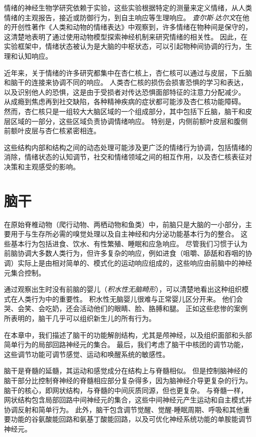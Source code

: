 情绪的神经生物学研究依赖于实验，这些实验根据特定的测量来定义情绪，从人类情绪的主观报告，接近或防御行为，到自主响应等生理响应。
\textit{查尔斯$\cdot$达尔文}在他的开创性著作《人类和动物的情绪表达》中观察到，许多情绪在物种间是保守的，这清楚地表明了通过使用动物模型探索神经机制来研究情绪的相关性。
因此，在实验框架中，情绪状态被认为是大脑的中枢状态，可以引起物种间协调的行为，生理和认知响应。


近年来，关于情绪的许多研究都集中在杏仁核上，杏仁核可以通过与皮层，下丘脑和脑干的连接来协调不同的响应。
人类杏仁核的损伤会损害恐惧的学习和表达，以及识别他人的恐惧，这是由于受损者对传达恐惧面部特征的注意力分配减少。
从成瘾到焦虑再到社交缺陷，各种精神疾病的症状都可能涉及杏仁核功能障碍。
然而，杏仁核只是一组较大大脑区域的一个组成部分，其中包括下丘脑，脑干和皮层区域的一部分，这些区域负责协调情绪响应。
特别是，内侧前额叶皮层和腹侧前额叶皮层与杏仁核紧密相连。

这些结构内部和结构之间的动态处理可能涉及更广泛的情绪行为协调，包括情绪的消除，情绪状态的认知调节，社交和情绪领域之间的相互作用，以及杏仁核表征对决策和主观感受的影响。


\chapter{脑干} \label{chap:chap40}

在原始脊椎动物（爬行动物、两栖动物和鱼类）中，前脑只是大脑的一小部分，主要用于与生存所必需的嗅觉处理以及自主神经和内分泌功能基本行为的整合。
这些基本行为包括进食、饮水、有性繁殖、睡眠和应急响应。
尽管我们习惯于认为前脑协调大多数人类行为，但许多复杂的响应，例如进食（咀嚼、舔舐和吞咽的协调）实际上是由相对简单的、模式化的运动响应组成的，这些响应由前脑中的神经元集合控制。


通过观察出生时没有前脑的婴儿（\textit{积水性无脑畸形}），可以清楚地看出这种组织模式在人类行为中的重要性。
积水性无脑婴儿很难与正常婴儿区分开来。
他们会哭、会笑、会吃奶，还会活动他们的眼睛、脸、胳膊和腿。
正如这些悲惨的案例所表明的，脑干几乎可以组织新生儿的所有行为。


在本章中，我们描述了脑干的功能解剖结构，尤其是颅神经，以及组织面部和头部简单行为的局部回路神经元的集合。
最后，我们考虑了脑干中核团的调节功能，这些调节功能可调节感觉、运动和唤醒系统的敏感性。


脑干是脊髓的延髓，其运动和感觉成分在结构上与脊髓相似。
但是控制脑神经的脑干部分比控制脊神经的脊髓相应部分复杂得多，因为脑神经介导更复杂的行为。
脑干的核心，即网状结构，与脊髓的中间灰质同源，但也更复杂。
与脊髓一样，网状结构包含局部回路中间神经元的集合，这些中间神经元产生运动和自主模式并协调反射和简单行为。
此外，脑干包含调节觉醒、觉醒-睡眠周期、呼吸和其他重要功能的谷氨酸能回路和氨基丁酸能回路，以及可优化神经系统功能的单胺能调节神经元。



